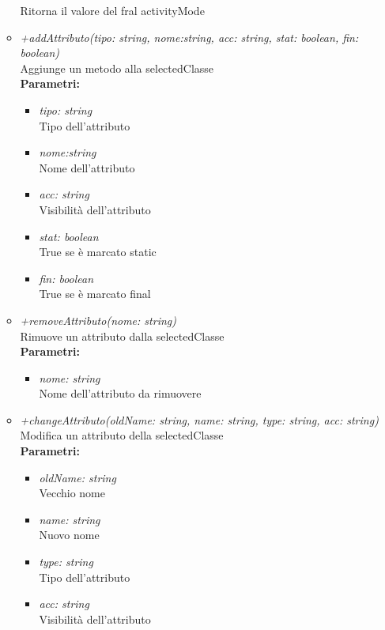 \begin{itemize}
\begin{itemize}
    		Ritorna il valore del fral activityMode
    		\item \emph{+addAttributo(tipo: string, nome:string, acc: string, stat: boolean, fin: boolean)}\\
    		Aggiunge un metodo alla selectedClasse\\
    		\textbf{Parametri:}
    		\begin{itemize}
    			\item \emph{tipo: string}\\
    			Tipo dell'attributo
    			\item \emph{nome:string}\\
    			Nome dell'attributo
    			\item \emph{acc: string}\\
    			Visibilità dell'attributo
    			\item \emph{stat: boolean}\\
    			True se è marcato static
    			\item \emph{fin: boolean}\\
    			True se è marcato final
    		\end{itemize}
    		\item \emph{+removeAttributo(nome: string)}\\
    		Rimuove un attributo dalla selectedClasse\\
    		\textbf{Parametri:}
    		\begin{itemize}
    			\item \emph{nome: string}\\
    			Nome dell'attributo da rimuovere
    		\end{itemize}
    		\item \emph{+changeAttributo(oldName: string, name: string, type: string, acc: string)}\\
    		Modifica un attributo della selectedClasse\\
    		\textbf{Parametri:}
    		\begin{itemize}
    			\item \emph{oldName: string}\\
    			Vecchio nome
    			\item \emph{name: string}\\
    			Nuovo nome
    			\item \emph{type: string}\\
    			Tipo dell'attributo
    			\item \emph{acc: string}\\
    			Visibilità dell'attributo

\end{itemize}
\end{itemize}
\end{itemize}
